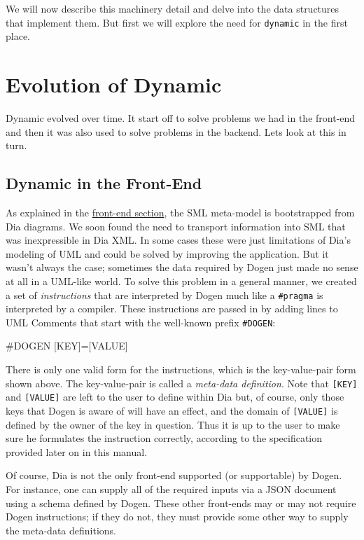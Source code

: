 \documentclass{book}
\begin{document}
We will now describe this machinery detail and delve into the data
structures that implement them. But first we will explore the need for
\texttt{dynamic} in the first place.

\section{Evolution of Dynamic}

Dynamic evolved over time. It start off to solve problems we had in
the front-end and then it was also used to solve problems in the
backend. Lets look at this in turn.

\subsection{Dynamic in the Front-End}

As explained in the
\href{https://github.com/DomainDrivenConsulting/dogen/blob/master/doc/manual/manual.org#the-front-end}{front-end
  section}, the SML meta-model is bootstrapped from Dia diagrams. We
soon found the need to transport information into SML that was
inexpressible in Dia XML. In some cases these were just limitations of
Dia's modeling of UML and could be solved by improving the
application. But it wasn't always the case; sometimes the data
required by Dogen just made no sense at all in a UML-like world. To
solve this problem in a general manner, we created a set of
\emph{instructions} that are interpreted by Dogen much like a
\texttt{\#pragma} is interpreted by a compiler. These instructions are
passed in by adding lines to UML Comments that start with the
well-known prefix \texttt{\#DOGEN}:

\begin{pseudocode}[backgroundcolor=\color{lightgray}]
#DOGEN [KEY]=[VALUE]
\end{pseudocode}

There is only one valid form for the instructions, which is the
key-value-pair form shown above. The key-value-pair is called a
\emph{meta-data definition}. Note that \texttt{[KEY]} and
\texttt{[VALUE]} are left to the user to define within Dia but, of
course, only those keys that Dogen is aware of will have an effect,
and the domain of \texttt{[VALUE]} is defined by the owner of the key
in question. Thus it is up to the user to make sure he formulates the
instruction correctly, according to the specification provided later
on in this manual.

Of course, Dia is not the only front-end supported (or supportable) by
Dogen. For instance, one can supply all of the required inputs via a
JSON document using a schema defined by Dogen. These other front-ends
may or may not require Dogen instructions; if they do not, they must
provide some other way to supply the meta-data definitions.
\end{document}
